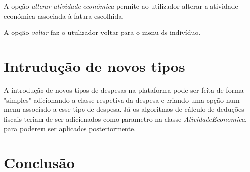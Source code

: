 \documentclass[12pt]{report}
\newcommand\tab[1][0.5cm]{\hspace*{#1}}
\begin{document}
A opção \textit{alterar atividade económica} permite ao utilizador alterar a atividade económica associada à fatura escolhida.

A opção \textit{voltar} faz o utulizador voltar para o menu de indivíduo.

\chapter{Intrudução de novos tipos}
\label{sec:intro}
\tab A introdução de novos tipos de despesas na plataforma pode ser feita de forma "simples" adicionando a classe respetiva da despesa e criando uma opção num menu associado a esse tipo de despesa. Já os algoritmos de cálculo de deduções fiscais teriam de ser adicionados como parametro na classe \textit{AtividadeEconomica}, para poderem ser aplicados posteriormente.

\chapter{Conclusão}
\label{sec:conclusao}
\end{document}
